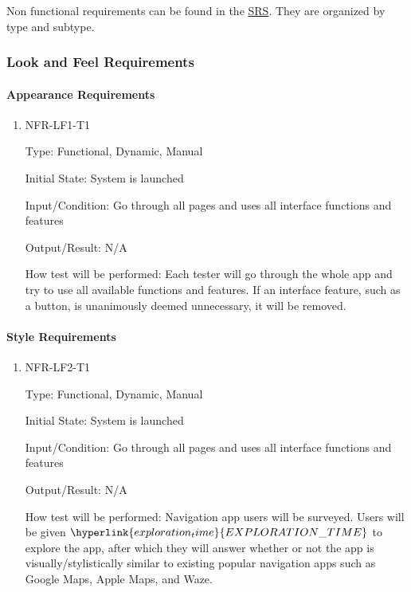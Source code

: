 \documentclass[12pt, titlepage]{article}
\begin{document}

Non functional requirements can be found in the
\href{https://github.com/parkd-app/park-d/blob/main/docs/SRS/SRS.pdf}{SRS}. They
are organized by type and subtype.

\subsubsection{Look and Feel Requirements}
\label{sec:5.2.1}
\paragraph{Appearance Requirements}

\begin{enumerate}

\item{NFR-LF1-T1}

Type: Functional, Dynamic, Manual
					
Initial State: System is launched
					
Input/Condition: Go through all pages and uses all interface functions and
features
					
Output/Result: N/A
					
How test will be performed: Each tester will go through the whole app and try to
use all available functions and features. If an interface feature, such as a
button, is unanimously deemed unnecessary, it will be removed.
					
\end{enumerate}

\paragraph{Style Requirements}

\begin{enumerate}

\item{NFR-LF2-T1}

Type: Functional, Dynamic, Manual
					
Initial State: System is launched
					
Input/Condition: Go through all pages and uses all interface functions and
features
					
Output/Result: N/A

How test will be performed: Navigation app users will be surveyed. Users will be
given $\hyperlink{exploration_time}{EXPLORATION\_TIME}$ to explore the app,
after which they will answer whether or not the app is visually/stylistically
similar to existing popular navigation apps such as Google Maps, Apple Maps, and
Waze. \color{red}{At least 5 users will be surveyed. At least 80\% of users
surveyed should indicate that there is a similarity.}
					
\end{enumerate}
\end{document}
